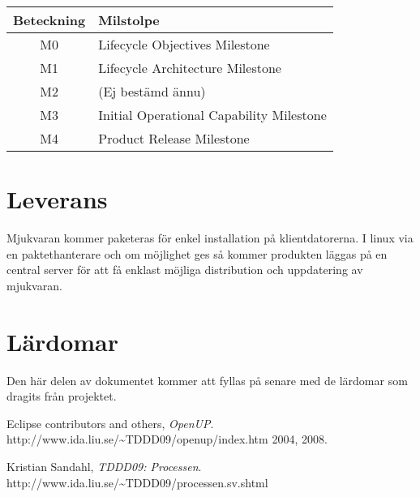 \begin{center}
	\begin{tabular}{| c | l |}
		\hline
		Beteckning & Milstolpe \\
		\hline
		M0 & Lifecycle Objectives Milestone \\
		\hline
		M1 & Lifecycle Architecture Milestone \\
		\hline
		M2 & (Ej bestämd ännu) \\
		\hline
		M3 & Initial Operational Capability Milestone \\
		\hline
		M4 & Product Release Milestone \\
		\hline
	\end{tabular}
\end{center}

\section{Leverans}
Mjukvaran kommer paketeras för enkel installation på klientdatorerna. I linux via en paktethanterare och om möjlighet ges så kommer  produkten läggas på en central server för att få enklast möjliga distribution och uppdatering av mjukvaran.

\section{Lärdomar}
Den här delen av dokumentet kommer att fyllas på senare med de lärdomar som dragits från projektet.

\begin{thebibliography}{9}
	Eclipse contributors and others,
	\emph{OpenUP}.
	http://www.ida.liu.se/\~{}TDDD09/openup/index.htm
	2004, 2008.

	Kristian Sandahl,
	\emph{TDDD09: Processen}.
	http://www.ida.liu.se/\~{}TDDD09/processen.sv.shtml
\end{thebibliography}



